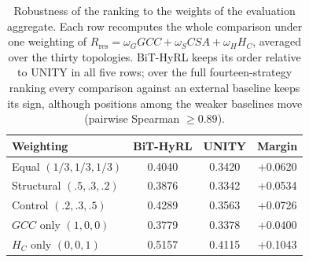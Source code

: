 \begin{table}[!htbp]
\centering
\caption{Robustness of the ranking to the weights of the evaluation aggregate. Each row recomputes the whole comparison under one weighting of $R_{\mathrm{res}}=\omega_{G}GCC+\omega_{S}CSA+\omega_{H}H_C$, averaged over the thirty topologies. BiT-HyRL keeps its order relative to UNITY in all five rows; over the full fourteen-strategy ranking every comparison against an external baseline keeps its sign, although positions among the weaker baselines move (pairwise Spearman $\geq 0.89$).}
\label{tab:sensitivity_weights}
\small
\begin{tabular}{@{}lccc@{}}
\toprule
\textbf{Weighting} & \textbf{BiT-HyRL} & \textbf{UNITY} & \textbf{Margin} \\
\midrule
Equal $(1/3,1/3,1/3)$ & 0.4040 & 0.3420 & +0.0620 \\
Structural $(.5,.3,.2)$ & 0.3876 & 0.3342 & +0.0534 \\
Control $(.2,.3,.5)$ & 0.4289 & 0.3563 & +0.0726 \\
$GCC$ only $(1,0,0)$ & 0.3779 & 0.3378 & +0.0400 \\
$H_C$ only $(0,0,1)$ & 0.5157 & 0.4115 & +0.1043 \\
\bottomrule
\end{tabular}
\end{table}
